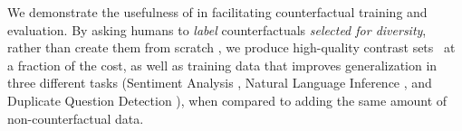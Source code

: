 We demonstrate the usefulness of \sysname in facilitating counterfactual training and evaluation. 
By asking humans to \emph{label} counterfactuals \emph{selected for diversity}, rather than create them from scratch \cite{gardner2020contrast, kaushik2019learning}, we produce high-quality contrast sets~\cite{gardner2020contrast} at a fraction of the cost, as well as training data that improves generalization in three different tasks (Sentiment Analysis \sst, Natural Language Inference \nli, and Duplicate Question Detection \qqp), when compared to adding the same amount of non-counterfactual data.



